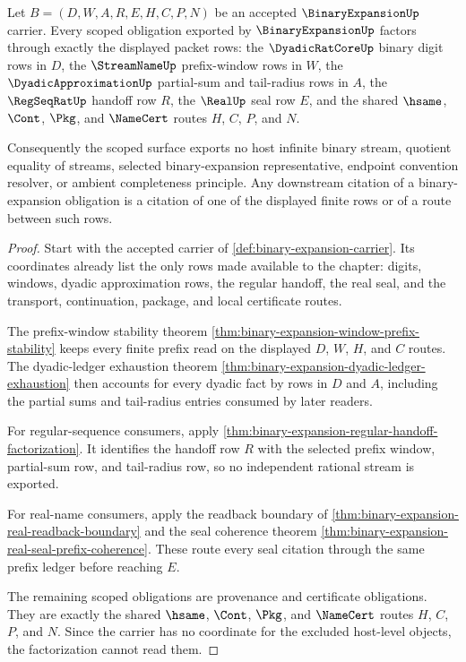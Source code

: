 \begin{theorem}
\label{thm:binary-expansion-scoped-dependency-factorization}
Let $B=(D,W,A,R,E,H,C,P,N)$ be an accepted $\BinaryExpansionUp$ carrier. Every scoped obligation exported by $\BinaryExpansionUp$ factors through exactly the displayed packet rows: the $\DyadicRatCoreUp$ binary digit rows in $D$, the $\StreamNameUp$ prefix-window rows in $W$, the $\DyadicApproximationUp$ partial-sum and tail-radius rows in $A$, the $\RegSeqRatUp$ handoff row $R$, the $\RealUp$ seal row $E$, and the shared $\hsame$, $\Cont$, $\Pkg$, and $\NameCert$ routes $H$, $C$, $P$, and $N$.

Consequently the scoped surface exports no host infinite binary stream, quotient equality of streams, selected binary-expansion representative, endpoint convention resolver, or ambient completeness principle. Any downstream citation of a binary-expansion obligation is a citation of one of the displayed finite rows or of a route between such rows.
\end{theorem}
\begin{proof}
Start with the accepted carrier of \autoref{def:binary-expansion-carrier}. Its coordinates already list the only rows made available to the chapter: digits, windows, dyadic approximation rows, the regular handoff, the real seal, and the transport, continuation, package, and local certificate routes.

The prefix-window stability theorem \autoref{thm:binary-expansion-window-prefix-stability} keeps every finite prefix read on the displayed $D$, $W$, $H$, and $C$ routes. The dyadic-ledger exhaustion theorem \autoref{thm:binary-expansion-dyadic-ledger-exhaustion} then accounts for every dyadic fact by rows in $D$ and $A$, including the partial sums and tail-radius entries consumed by later readers.

For regular-sequence consumers, apply \autoref{thm:binary-expansion-regular-handoff-factorization}. It identifies the handoff row $R$ with the selected prefix window, partial-sum row, and tail-radius row, so no independent rational stream is exported.

For real-name consumers, apply the readback boundary of \autoref{thm:binary-expansion-real-readback-boundary} and the seal coherence theorem \autoref{thm:binary-expansion-real-seal-prefix-coherence}. These route every seal citation through the same prefix ledger before reaching $E$.

The remaining scoped obligations are provenance and certificate obligations. They are exactly the shared $\hsame$, $\Cont$, $\Pkg$, and $\NameCert$ routes $H$, $C$, $P$, and $N$. Since the carrier has no coordinate for the excluded host-level objects, the factorization cannot read them.
\end{proof}

